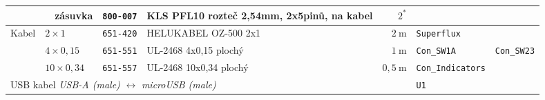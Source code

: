 \documentclass[twoside,project,skipblank]{../MFFPrace}
\begin{document}
\begin{landscape}
\begin{table}[!h]
\begin{tabular}{|l|l|l||c|l|r||l|l|l|l|}
                                                                                                                 &                                         & zásuvka                                                                                     & \texttt{800-007}              & \tiny{KLS PFL10 rozteč 2,54mm, 2x5pinů, na kabel}           & $2^*$                                              & \multicolumn{3}{l|}{}                                                     &                                                                     \\\hline
            \multirow{3}{*}{Kabel}                                                                               & \multicolumn{2}{l||}{$2\times 1$}       & \texttt{651-420}                                                                            & \tiny{HELUKABEL OZ-500 2x1}   & $2\:\text{m}$                                               & \multicolumn{2}{l|}{\texttt{Superflux}}            & \multicolumn{2}{l|}{}                                                                                                                           \\\cline{2-10}
                                                                                                                 & \multicolumn{2}{l||}{$4\times 0{,}15$}  & \texttt{651-551}                                                                            & \tiny{UL-2468 4x0,15 plochý}  & $1\:\text{m}$                                               & \multicolumn{2}{l|}{\texttt{Con\_SW1A}}            & \multicolumn{2}{l|}{\texttt{Con\_SW23}}                                                                                                         \\\cline{2-10}
                                                                                                                 & \multicolumn{2}{l||}{$10\times 0{,}34$} & \texttt{651-557}                                                                            & \tiny{UL-2468 10x0,34 plochý} & $0{,}5\:\text{m}$                                           & \multicolumn{3}{l|}{\texttt{Con\_Indicators}}      &                                                                                                                                                 \\\hline
            \multicolumn{6}{|l||}{USB kabel \textit{USB-A (male)} $\leftrightarrow$ \textit{microUSB (male)}}    & \texttt{U1}                            & \multicolumn{3}{l|}{}                                                                                                                                                                                                                                                                                                                                                                            \\\hline

\end{tabular}
\end{table}
\end{landscape}
\end{document}
